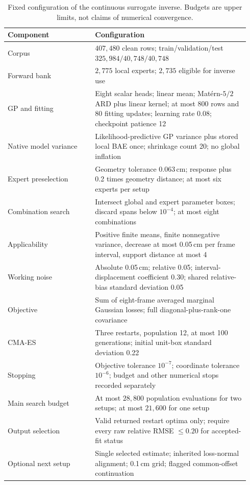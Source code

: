 \begin{table}[!htbp]
\centering\footnotesize
\setlength{\tabcolsep}{4pt}
\caption{Fixed configuration of the continuous surrogate inverse.
Budgets are upper limits, not claims of numerical convergence.}
\label{tab:hyper}
\begin{tabular}{@{}p{0.34\linewidth}p{0.60\linewidth}@{}}
\toprule
Component & Configuration \\
\midrule
Corpus & $407{,}480$ clean rows; train/validation/test
$325{,}984/40{,}748/40{,}748$ \\
Forward bank & $2{,}775$ local experts; $2{,}735$ eligible for inverse use \\
GP and fitting & Eight scalar heads; linear mean; Mat\'ern-$5/2$
ARD plus linear kernel; at most 800 rows and 80 fitting updates;
learning rate 0.08; checkpoint patience 12 \\
Native model variance & Likelihood-predictive GP variance plus
stored local BAE once; shrinkage count 20; no global inflation \\
Expert preselection & Geometry tolerance 0.063\,cm; response plus
0.2 times geometry distance; at most six experts per setup \\
Combination search & Intersect global and expert parameter boxes;
discard spans below $10^{-4}$; at most eight combinations \\
Applicability & Positive finite means, finite nonnegative variance,
decrease at most 0.05\,cm per frame interval, support distance at most 4 \\
Working noise & Absolute 0.05\,cm; relative 0.05; interval-displacement
coefficient 0.30; shared relative-bias standard deviation 0.05 \\
Objective & Sum of eight-frame averaged marginal Gaussian losses;
full diagonal-plus-rank-one covariance \\
CMA-ES & Three restarts, population 12, at most 100 generations;
initial unit-box standard deviation 0.22 \\
Stopping & Objective tolerance $10^{-7}$; coordinate tolerance
$10^{-6}$; budget and other numerical stops recorded separately \\
Main search budget & At most $28{,}800$ population evaluations for
two setups; at most $21{,}600$ for one setup \\
Output selection & Valid returned restart optima only; require
every raw relative RMSE $\leq0.20$ for accepted-fit status \\
Optional next setup & Single selected estimate; inherited loss-normal
alignment; 0.1\,cm grid; flagged common-offset continuation \\
\bottomrule
\end{tabular}
\end{table}

